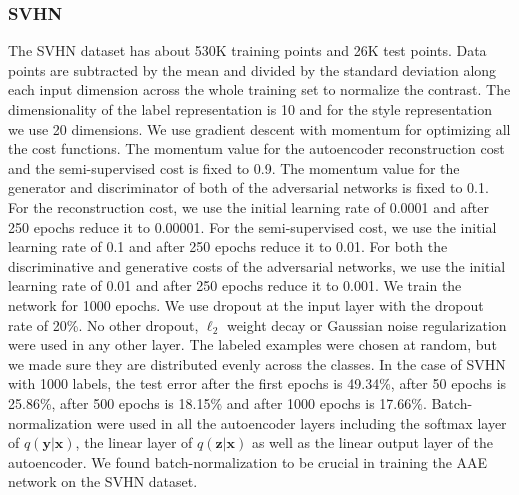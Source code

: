 \documentclass{article}
\begin{document}
\begin{appendices}
\subsubsection{SVHN}
The SVHN dataset has about 530K training points and 26K test points. Data points are subtracted by the mean and divided by the standard deviation along each input dimension across the whole training set to normalize the contrast. The dimensionality of the label representation is 10 and for the style representation we use 20 dimensions. We use gradient descent with momentum for optimizing all the cost functions. The momentum value for the autoencoder reconstruction cost and the semi-supervised cost is fixed to 0.9. The momentum value for the generator and discriminator of both of the adversarial networks is fixed to 0.1. For the reconstruction cost, we use the initial learning rate of 0.0001 and after 250 epochs reduce it to 0.00001. For the semi-supervised cost, we use the initial learning rate of 0.1 and after 250 epochs reduce it to 0.01. For both the discriminative and generative costs of the adversarial networks, we use the initial learning rate of 0.01 and after 250 epochs reduce it to 0.001. We train the network for 1000 epochs. We use dropout at the input layer with the dropout rate of 20\%. No other dropout, $\ell_2$ weight decay or Gaussian noise regularization were used in any other layer. The labeled examples were chosen at random, but we made sure they are distributed evenly across the classes. In the case of SVHN with 1000 labels, the test error after the first epochs is 49.34\%, after 50 epochs is 25.86\%, after 500 epochs is 18.15\% and after 1000 epochs is 17.66\%. Batch-normalization were used in all the autoencoder layers including the softmax layer of $q(\mathbf{y}|\mathbf{x})$, the linear layer of $q(\mathbf{z}|\mathbf{x})$ as well as the linear output layer of the autoencoder. We found batch-normalization \citep{batch} to be crucial in training the AAE network on the SVHN dataset.


\end{appendices}
\end{document}
